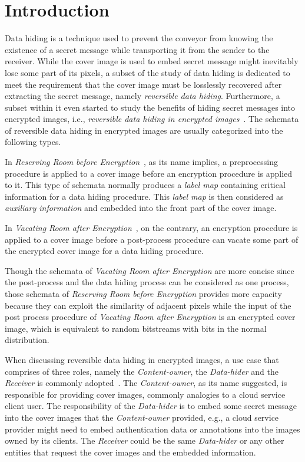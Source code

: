 \section{Introduction}
\label{sec:intro}

Data hiding is a technique used to prevent the conveyor from knowing the existence of a secret message while transporting it from the sender to the receiver. 
While the cover image is used to embed secret message might inevitably lose some part of its pixels, a subset of the study of data hiding is dedicated to meet the requirement that the cover image must be losslessly recovered after extracting the secret message, namely \emph{reversible data hiding}. 
Furthermore, a subset within it even started to study the benefits of hiding secret messages into encrypted images, i.e., \emph{reversible data hiding in encrypted images}~\cite{Zhang2011, Liu2020, Jain2021, Di2018}.
The schemata of reversible data hiding in encrypted images are usually categorized into the following types. 

In \emph{Reserving Room before Encryption}~\cite{Ma2013, Agrawal2017, Liao2015}, as its name implies, a preprocessing procedure is applied to a cover image before an encryption procedure is applied to it. 
This type of schemata normally produces a \emph{label map} containing critical information for a data hiding procedure. 
This \emph{label map} is then considered as \emph{auxiliary information} and embedded into the front part of the cover image.

In \emph{Vacating Room after Encryption}~\cite{Puech2008, Wu2019, Li2018}, on the contrary, an encryption procedure is applied to a cover image before a post-process procedure can vacate some part of the encrypted cover image for a data hiding procedure.

Though the schemata of \emph{Vacating Room after Encryption} are more concise since the post-process and the data hiding process can be considered as one process, 
those schemata of \emph{Reserving Room before Encryption} provides more capacity because they can exploit the similarity of adjacent pixels while the input of the post process procedure of \emph{Vacating Room after Encryption} is an encrypted cover image, which is equivalent to random bitstreams with bits in the normal distribution.

When discussing reversible data hiding in encrypted images, a use case that comprises of three roles, namely the \emph{Content-owner}, the \emph{Data-hider} and the \emph{Receiver} is commonly adopted~\cite{Qin2015}.
The \emph{Content-owner}, as its name suggested, is responsible for providing cover images, commonly analogies to a cloud service client user.
The responsibility of the \emph{Data-hider} is to embed some secret message into the cover images that the \emph{Content-owner} provided, e.g., a cloud service provider might need to embed authentication data or annotations into the images owned by its clients. 
The \emph{Receiver} could be the same \emph{Data-hider} or any other entities that request the cover images and the embedded information.

